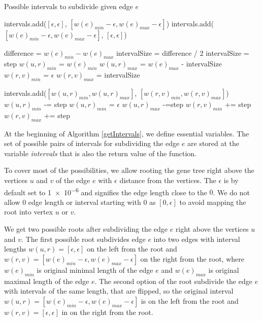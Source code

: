 \begin{algorithm}[!htbp]
\caption{Possible intervals to subdivide given edge $e$} 
\label{getIntervals}
\begin{algorithmic}[1]
	\State intervals.add($[ \epsilon, \epsilon ]$, $[ w(e)_{min}-\epsilon, w(e)_{max}-\epsilon ]$) 
	\State intervals.add($[ w(e)_{min}-\epsilon, w(e)_{max}-\epsilon ]$, $[ \epsilon, \epsilon ]$)

	\State difference = $w(e)_{min} - w(e)_{max}$
		\State intervalSize = difference / 2
	\Else
		\State intervalSize = step
	\EndIf
	\State $w(u,r)_{min}$ = $w(e)_{min}$
	\State $w(u,r)_{max}$ = $w(e)_{max}$ - intervalSize
	\State $w(r,v)_{min}$ = $\epsilon$
	\State $w(r,v)_{max}$ = intervalSize
	
		\State intervals.add($[w(u,r)_{min}, w(u,r)_{max}]$, $[w(r,v)_{min},w(r,v)_{max}]$)
		\State $w(u,r)_{min}$ -= step
			\State $w(u,r)_{min}$ = $\epsilon$
		\EndIf
		\State $w(u,r)_{max}$ -=step
		\State $w(r,v)_{min}$ += step
		\State $w(r,v)_{max}$ += step
	\EndWhile

	\EndIf
\EndFunction
\end{algorithmic}
\end{algorithm}

At the beginning of Algorithm \ref{getIntervals}, we define essential variables. The set of possible pairs of intervals for subdividing the edge $e$ are stored at the variable \emph{intervals} that is also the return value of the function.

To cover most of the possibilities, we allow rooting the gene tree right above the vertices $u$ and $v$ of the edge $e$ with $\epsilon$ distance from the vertices. The $\epsilon$ is by default set to \num{1e-6} and signifies the edge length close to the $0$. We do not allow $0$ edge length or interval starting with $0$ as $[0, \epsilon]$ to avoid mapping the root into vertex $u$ or $v$.

We get two possible roots after subdividing the edge $e$ right above the vertices $u$ and $v$. The first possible root subdivides edge $e$ into two edges with interval lengths $w(u, r) = [ \epsilon, \epsilon ]$ on the left from the root and $w(r, v) = [ w(e)_{min}-\epsilon, w(e)_{max}-\epsilon ]$ on the right from the root, where $w(e)_{min}$ is original minimal length of the edge $e$ and $w(e)_{max}$ is original maximal length of the edge $e$. The second option of the root subdivide the edge $e$ with intervals of the same length, that are flipped, so the original interval $w(u, r) = [ w(e)_{min}-\epsilon, w(e)_{max}-\epsilon ]$ is on the left from the root and $w(r, v) = [ \epsilon, \epsilon ]$ in on the right from the root.

